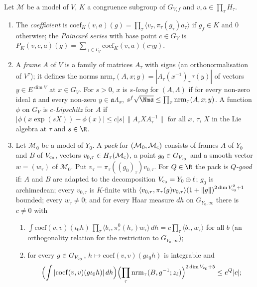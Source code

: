 \begin{definition}\label{pf:fs:pack}
Let $\mathcal M$ be a model of $V$, $K$ a congruence subgroup of $G_{V,f}$ and $v,a\in\prod_\tau H_\tau$.
\begin{enumerate}[label=(\alph*)]
\item The \emph{coefficient} is $\mathrm{coef}_K(v,a)(g)=\prod_\tau\langle v_\tau,\pi_\tau(g_\tau)a_\tau\rangle$ if $g_f\in K$ and $0$
otherwise; the \emph{Poincar\'e series} with base point $c\in G_V$ is
$P_K(v,c,a)(g)=\sum_{\gamma\in\Gamma_V}\mathrm{coef}_K(v,a)(c\gamma g)$.
\item A \emph{frame} $A$ of $V$ is a family of matrices $A_\tau$ with signs (an orthonormalisation of $V^\tau$); it defines the norms
$\mathrm{nrm}_\tau(A,x;y)=|A_\tau(x^{-1})_\tau\,\tau(y)|$ of vectors $y\in E^{\dim V}$ at $x\in G_V$. For $s>0$, $x$ is
\emph{$s$-long} for $(A,\Lambda)$ if for every non-zero ideal $\mathfrak a$ and every non-zero $y\in\mathfrak a\Lambda_x$,
$s^{f}\sqrt{\Nm\mathfrak a}\le\prod_\tau\mathrm{nrm}_\tau(A,x;y)$. A function $\phi$ on $G_V$ is \emph{$c$-Lipschitz} for $A$ if
$|\phi(x\exp(sX))-\phi(x)|\le c|s|\,\|A_\tau XA_\tau^{-1}\|$ for all $x$, $\tau$, $X$ in the Lie algebra at $\tau$ and $s\in\R$.
\item Let $\mathcal M_0$ be a model of $Y_0$. A \emph{pack} for $(\mathcal M_0,\mathcal M_{\mathrm{c}})$ consists of frames $A$ of $Y_0$ and
$B$ of $V_{\mathrm{c}_0}$, vectors $v_{0,\tau}\in H_\tau(\mathcal M_{\mathrm{c}})$, a point $g_0\in G_{V_{\mathrm{c}_0}}$ and a smooth vector
$w=(w_\tau)$ of $\mathcal M_0$. Put $v_\tau=\pi_\tau((g_0)_\tau)v_{0,\tau}$. For $Q\in\R$ the pack is \emph{$Q$-good} if: $A$ and $B$
are adapted to the decomposition $V_{\mathrm{c}_0}=Y_0\oplus\ell$; $g_0$ is archimedean; every $v_{0,\tau}$ is $K$-finite with
$\langle v_{0,\tau},\pi_\tau(g)v_{0,\tau}\rangle(1+\|g\|)^{2\dim V_{\mathrm{c}_0}^2+1}$ bounded; every $w_\tau\ne0$; and for every Haar
measure $dh$ on $G_{Y_0,\infty}$ there is $c\ne0$ with
\begin{enumerate}[label=(\roman*)]
\item $\int\mathrm{coef}(v,v)(\iota_0h)\,\prod_\tau\langle b_\tau,\pi^0_\tau(h_\tau)w_\tau\rangle\,dh=c\prod_\tau\langle b_\tau,w_\tau\rangle$ for all
$b$ (an orthogonality relation for the restriction to $G_{Y_0,\infty}$);
\item for every $g\in G_{V_{\mathrm{c}_0}}$, $h\mapsto\mathrm{coef}(v,v)(g\iota_0h)$ is integrable and
\[
\Bigl(\int|\mathrm{coef}(v,v)(g\iota_0h)|\,dh\Bigr)\Bigl(\prod_\tau\mathrm{nrm}_\tau(B,g^{-1};z_\ell)\Bigr)^{2\dim V_{\mathrm{c}_0}+5}\le e^Q|c|;
\]
\end{enumerate}
\end{enumerate}
\end{definition}
